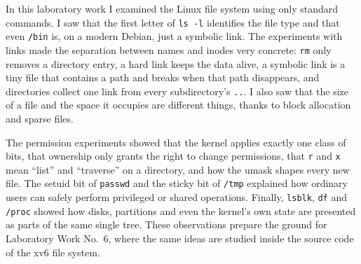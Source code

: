 \documentclass[12pt,a4paper]{article}
\begin{document}
In this laboratory work I examined the Linux file system using only standard commands. I saw that the first letter of \texttt{ls -l} identifies the file type and that even \texttt{/bin} is, on a modern Debian, just a symbolic link. The experiments with links made the separation between names and inodes very concrete: \texttt{rm} only removes a directory entry, a hard link keeps the data alive, a symbolic link is a tiny file that contains a path and breaks when that path disappears, and directories collect one link from every subdirectory's \texttt{..}. I also saw that the size of a file and the space it occupies are different things, thanks to block allocation and sparse files.

The permission experiments showed that the kernel applies exactly one class of bits, that ownership only grants the right to change permissions, that \texttt{r} and \texttt{x} mean ``list'' and ``traverse'' on a directory, and how the umask shapes every new file. The setuid bit of \texttt{passwd} and the sticky bit of \texttt{/tmp} explained how ordinary users can safely perform privileged or shared operations. Finally, \texttt{lsblk}, \texttt{df} and \texttt{/proc} showed how disks, partitions and even the kernel's own state are presented as parts of the same single tree. These observations prepare the ground for Laboratory Work No.~6, where the same ideas are studied inside the source code of the xv6 file system.
\end{document}
